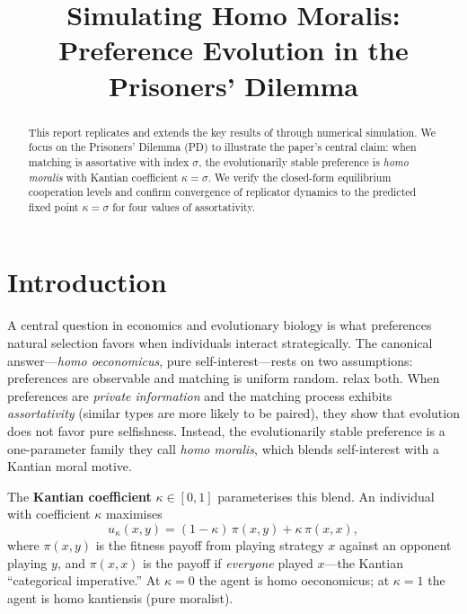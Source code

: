 \documentclass[12pt]{article}
\title{Simulating Homo Moralis:\\
Preference Evolution in the Prisoners' Dilemma}
\author{}
\date{}
\begin{document}
\maketitle

\begin{abstract}
\noindent
This report replicates and extends the key results of \citet{AlgerWeibull2013}
through numerical simulation. We focus on the Prisoners' Dilemma (PD) to
illustrate the paper's central claim: when matching is assortative with index
$\sigma$, the evolutionarily stable preference is \emph{homo moralis} with
Kantian coefficient $\kappa = \sigma$. We verify the closed-form equilibrium
cooperation levels and confirm convergence of replicator dynamics to the
predicted fixed point $\kappa = \sigma$ for four values of assortativity.
\end{abstract}

\section{Introduction}

A central question in economics and evolutionary biology is what preferences
natural selection favors when individuals interact strategically. The canonical
answer---\emph{homo oeconomicus}, pure self-interest---rests on two assumptions:
preferences are observable and matching is uniform random. \citet{AlgerWeibull2013}
relax both. When preferences are \emph{private information} and the matching
process exhibits \emph{assortativity} (similar types are more likely to be
paired), they show that evolution does not favor pure selfishness. Instead, the
evolutionarily stable preference is a one-parameter family they call
\emph{homo moralis}, which blends self-interest with a Kantian moral motive.

The \textbf{Kantian coefficient} $\kappa \in [0,1]$ parameterises this blend.
An individual with coefficient $\kappa$ maximises
\begin{equation}
    u_\kappa(x,y) = (1-\kappa)\,\pi(x,y) + \kappa\,\pi(x,x),
    \label{eq:homo_moralis}
\end{equation}
where $\pi(x,y)$ is the fitness payoff from playing strategy $x$ against an
opponent playing $y$, and $\pi(x,x)$ is the payoff if \emph{everyone} played
$x$---the Kantian ``categorical imperative.'' At $\kappa=0$ the agent is homo
oeconomicus; at $\kappa=1$ the agent is homo kantiensis (pure moralist).
\end{document}
